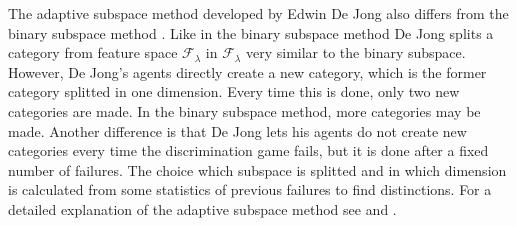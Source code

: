 The adaptive subspace method developed by Edwin De Jong also differs from the binary subspace method \citep{dejongvogt:1998,dejong:2000}. Like in the binary subspace method De Jong splits a category from feature space ${\mathcal F}_\lambda$ in ${\mathcal F}_{\lambda}$ very similar to the binary subspace. However, De Jong's agents directly create a new category, which is the former category splitted in one dimension. Every time this is done, only two new categories are made. In the binary subspace method, more categories may be made. Another difference is that De Jong lets his agents do not create new categories every time the discrimination game fails, but it is done after a fixed number of failures. The choice which subspace is splitted and in which dimension is calculated from some statistics of previous failures to find distinctions. For a detailed explanation of the adaptive subspace method see \citealt{dejongvogt:1998} and \citealt{dejong:2000}.

